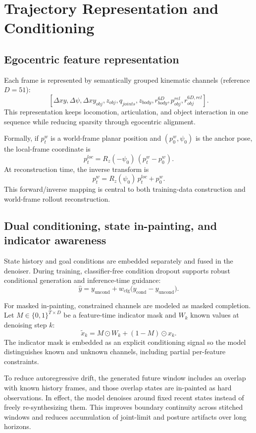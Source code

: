 \section{Trajectory Representation and Conditioning}

\subsection{Egocentric feature representation}

Each frame is represented by semantically grouped kinematic channels (reference $D=51$):
\[
[\Delta xy,\Delta\psi,\Delta xy_{obj},z_{obj},q_{joints},z_{body},r^{6D}_{body},p^{rel}_{obj},r^{6D,rel}_{obj}].
\]
This representation keeps locomotion, articulation, and object interaction in one sequence while reducing sparsity through egocentric alignment.

Formally, if $p_t^{w}$ is a world-frame planar position and $(p_0^{w},\psi_0)$ is the anchor pose, the local-frame coordinate is
\[
p_t^{loc}=R_z(-\psi_0)\,(p_t^{w}-p_0^{w}).
\]
At reconstruction time, the inverse transform is
\[
p_t^{w}=R_z(\psi_0)\,p_t^{loc}+p_0^{w}.
\]
This forward/inverse mapping is central to both training-data construction and world-frame rollout reconstruction.

\subsection{Dual conditioning, state in-painting, and indicator awareness}

State history and goal conditions are embedded separately and fused in the denoiser. During training, classifier-free condition dropout supports robust conditional generation and inference-time guidance:
\[
\hat y = y_{\mathrm{uncond}} + w_{\mathrm{cfg}}\big(y_{\mathrm{cond}}-y_{\mathrm{uncond}}\big).
\]

For masked in-painting, constrained channels are modeled as masked completion. Let $M\in\{0,1\}^{T\times D}$ be a feature-time indicator mask and $W_k$ known values at denoising step $k$:
\[
\tilde x_k=M\odot W_k + (1-M)\odot x_k.
\]
The indicator mask is embedded as an explicit conditioning signal so the model distinguishes known and unknown channels, including partial per-feature constraints.

To reduce autoregressive drift, the generated future window includes an overlap with known history frames, and those overlap states are in-painted as hard observations. In effect, the model denoises around fixed recent states instead of freely re-synthesizing them. This improves boundary continuity across stitched windows and reduces accumulation of joint-limit and posture artifacts over long horizons.

